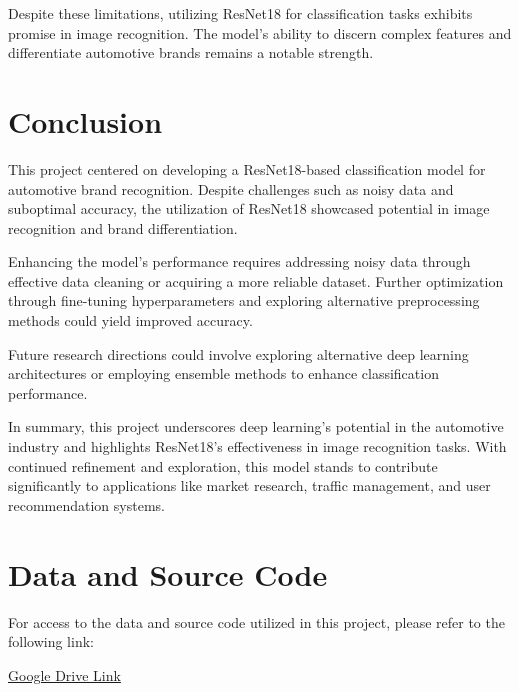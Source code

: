\documentclass{article}
\begin{document}
Despite these limitations, utilizing ResNet18 for classification tasks exhibits promise in image recognition. The model's ability to discern complex features and differentiate automotive brands remains a notable strength.

\section{Conclusion}
This project centered on developing a ResNet18-based classification model for automotive brand recognition. Despite challenges such as noisy data and suboptimal accuracy, the utilization of ResNet18 showcased potential in image recognition and brand differentiation.

Enhancing the model's performance requires addressing noisy data through effective data cleaning or acquiring a more reliable dataset. Further optimization through fine-tuning hyperparameters and exploring alternative preprocessing methods could yield improved accuracy.

Future research directions could involve exploring alternative deep learning architectures or employing ensemble methods to enhance classification performance.

In summary, this project underscores deep learning's potential in the automotive industry and highlights ResNet18's effectiveness in image recognition tasks. With continued refinement and exploration, this model stands to contribute significantly to applications like market research, traffic management, and user recommendation systems.

\section{Data and Source Code}
For access to the data and source code utilized in this project, please refer to the following link: 


\href{https://drive.google.com/drive/folders/1S3XY0bmViWT4PWdOAeBQNUHMYYkH8b9U?usp=sharing}{Google Drive Link}
\end{document}
